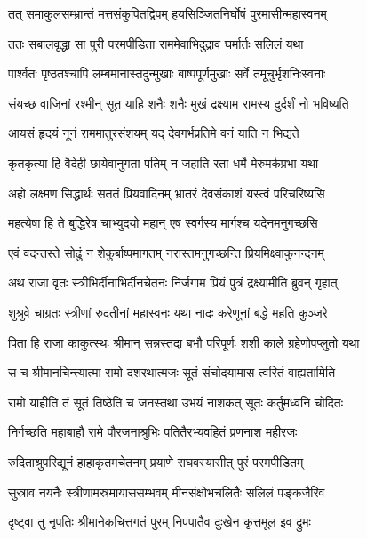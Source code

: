 \twolineshloka
{तत् समाकुलसम्भ्रान्तं मत्तसंकुपितद्विपम्}
{हयसिञ्जितनिर्घोषं पुरमासीन्महास्वनम्} %

\twolineshloka
{ततः सबालवृद्धा सा पुरी परमपीडिता}
{राममेवाभिदुद्राव घर्मार्तः सलिलं यथा} %

\twolineshloka
{पार्श्वतः पृष्ठतश्चापि लम्बमानास्तदुन्मुखाः}
{बाष्पपूर्णमुखाः सर्वे तमूचुर्भृशनिःस्वनाः} %

\twolineshloka
{संयच्छ वाजिनां रश्मीन् सूत याहि शनैः शनैः}
{मुखं द्रक्ष्याम रामस्य दुर्दर्शं नो भविष्यति} %

\twolineshloka
{आयसं हृदयं नूनं राममातुरसंशयम्}
{यद् देवगर्भप्रतिमे वनं याति न भिद्यते} %

\twolineshloka
{कृतकृत्या हि वैदेही छायेवानुगता पतिम्}
{न जहाति रता धर्मे मेरुमर्कप्रभा यथा} %

\twolineshloka
{अहो लक्ष्मण सिद्धार्थः सततं प्रियवादिनम्}
{भ्रातरं देवसंकाशं यस्त्वं परिचरिष्यसि} %

\twolineshloka
{महत्येषा हि ते बुद्धिरेष चाभ्युदयो महान्}
{एष स्वर्गस्य मार्गश्च यदेनमनुगच्छसि} %

\twolineshloka
{एवं वदन्तस्ते सोढुं न शेकुर्बाष्पमागतम्}
{नरास्तमनुगच्छन्ति प्रियमिक्ष्वाकुनन्दनम्} %

\twolineshloka
{अथ राजा वृतः स्त्रीभिर्दीनाभिर्दीनचेतनः}
{निर्जगाम प्रियं पुत्रं द्रक्ष्यामीति ब्रुवन् गृहात्} %

\twolineshloka
{शुश्रुवे चाग्रतः स्त्रीणां रुदतीनां महास्वनः}
{यथा नादः करेणूनां बद्धे महति कुञ्जरे} %

\twolineshloka
{पिता हि राजा काकुत्स्थः श्रीमान् सन्नस्तदा बभौ}
{परिपूर्णः शशी काले ग्रहेणोपप्लुतो यथा} %

\twolineshloka
{स च श्रीमानचिन्त्यात्मा रामो दशरथात्मजः}
{सूतं संचोदयामास त्वरितं वाह्यतामिति} %

\twolineshloka
{रामो याहीति तं सूतं तिष्ठेति च जनस्तथा}
{उभयं नाशकत् सूतः कर्तुमध्वनि चोदितः} %

\twolineshloka
{निर्गच्छति महाबाहौ रामे पौरजनाश्रुभिः}
{पतितैरभ्यवहितं प्रणनाश महीरजः} %

\twolineshloka
{रुदिताश्रुपरिद्यूनं हाहाकृतमचेतनम्}
{प्रयाणे राघवस्यासीत् पुरं परमपीडितम्} %

\twolineshloka
{सुस्राव नयनैः स्त्रीणामस्रमायाससम्भवम्}
{मीनसंक्षोभचलितैः सलिलं पङ्कजैरिव} %

\twolineshloka
{दृष्ट्वा तु नृपतिः श्रीमानेकचित्तगतं पुरम्}
{निपपातैव दुःखेन कृत्तमूल इव द्रुमः} %


